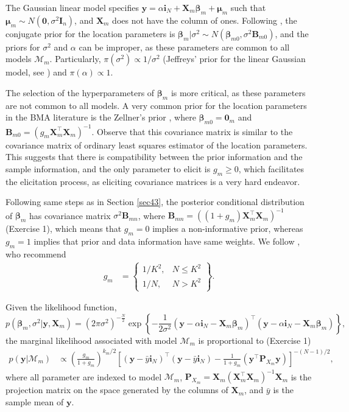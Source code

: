 The Gaussian linear model specifies $\bm{y}=\alpha\bm{i}_N+\bm{X}_m\bm{\beta}_m+\bm{\mu}_m$ such that $\bm{\mu}_m\sim{N}(\bm{0},\sigma^2\bm{I}_n)$, and $\bm{X}_m$ does not have the column of ones. Following \cite{koop2003bayesian}, the conjugate prior for the location parameters is $\bm{\beta}_m|\sigma^2 \sim {N}(\bm{\beta}_{m0}, \sigma^2 \bm{B}_{m0})$, and the priors for $\sigma^2$ and $\alpha$ can be improper, as these parameters are common to all models $\mathcal{M}_m$. Particularly, $\pi(\sigma^2)\propto 1/\sigma^2$ (Jeffreys' prior for the linear Gaussian model, see \cite{prior1991bayesian}) and $\pi(\alpha)\propto 1$.

The selection of the hyperparameters of $\bm{\beta}_m$ is more critical, as these parameters are not common to all models. A very common prior for the location parameters in the BMA literature is the Zellner's prior \cite{zellner1986assessing}, where $\bm{\beta}_{m0}=\bm{0}_m$ and $\bm{B}_{m0}=(g_m\bm{X}_m^{\top}\bm{X}_m)^{-1}$. Observe that this covariance matrix is similar to the covariance matrix of ordinary least squares estimator of the location parameters. This suggests that there is compatibility between the prior information and the sample information, and the only parameter to elicit is $g_m\geq 0$, which facilitates the elicitation process, as eliciting covariance matrices is a very hard endeavor.

Following same steps as in Section \ref{sec43}, the posterior conditional distribution of $\bm{\beta}_m$ has covariance matrix $\sigma^2\bm{B}_{mn}$, where $\bm{B}_{mn}=((1+g_m)\bm{X}_m^{\top}\bm{X}_m)^{-1}$ (Exercise 1), which means that $g_m=0$ implies a non-informative prior, whereas $g_m=1$ implies that prior and data information have same weights. We follow \cite{fernandez2001benchmark}, who recommend
\begin{align*}
	g_m & =
	\begin{Bmatrix}
		1/K^2, & N \leq K^2\\
		1/N, & N>K^2 
	\end{Bmatrix}.
\end{align*}  
 
Given the likelihood function, 
\begin{equation*}
	p(\bm{\beta}_m, \sigma^2|\bm{y}, \bm{X}_m) = (2\pi\sigma^2)^{-\frac{N}{2}} \exp \left\{-\frac{1}{2\sigma^2} (\bm{y} - \alpha\bm{i}_N - \bm{X}_m\bm{\beta}_m)^{\top}(\bm{y} - \alpha\bm{i}_N - \bm{X}_m\bm{\beta}_m) \right\},
\end{equation*}
the marginal likelihood associated with model $\mathcal{M}_m$ is proportional to (Exercise 1) 
\begin{align*}
	p(\bm{y}|\mathcal{M}_m)&\propto \left(\frac{g_m}{1+g_m}\right)^{k_m/2} \left[(\bm{y}-\bar{y}\bm{i}_N)^{\top}(\bm{y}-\bar{y}\bm{i}_N)-\frac{1}{1+g_m}(\bm{y}^{\top}\bm{P}_{X_m}\bm{y})\right]^{-(N-1)/2},
\end{align*}
where all parameter are indexed to model $\mathcal{M}_m$, $\bm{P}_{X_m}=\bm{X}_m(\bm{X}_m^{\top}\bm{X}_m)^{-1}\bm{X}_m$ is the projection matrix on the space generated by the columns of $\bm{X}_m$, and $\bar{y}$ is the sample mean of $\bm{y}$.

